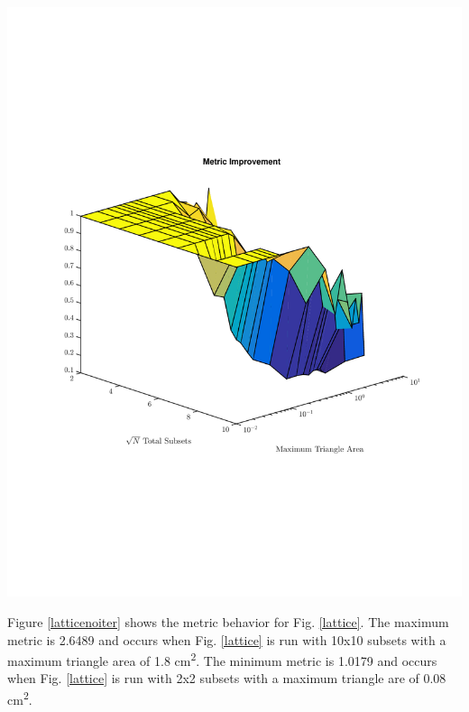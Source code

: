 \noindent\begin{minipage}{\textwidth}
\centering
\includegraphics[scale=0.80, trim = 2cm 6cm 2cm 7cm,clip]{figures/SameDiff.pdf}
\label{samediff}
\end{minipage}
\smallskip

Figure \ref{latticenoiter} shows the metric behavior for Fig. \ref{lattice}. The maximum metric is 2.6489 and occurs when Fig. \ref{lattice} is run with 10x10 subsets with a maximum triangle area of 1.8 cm\textsuperscript{2}. The minimum metric is 1.0179 and occurs when Fig. \ref{lattice} is run with 2x2 subsets with a maximum triangle are of 0.08 cm\textsuperscript{2}.

